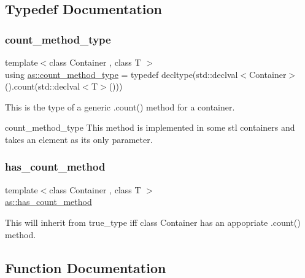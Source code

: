 \subsection{Typedef Documentation}
\mbox{\label{namespaceas_a9bd788709567003423247a9db4ba1074}} 
\subsubsection{\texorpdfstring{count\+\_\+method\+\_\+type}{count\_method\_type}}
{\footnotesize\ttfamily template$<$class Container , class T $>$ \\
using \hyperlink{namespaceas_a9bd788709567003423247a9db4ba1074}{as\+::count\+\_\+method\+\_\+type} = typedef decltype(std\+::declval$<$Container$>$().count(std\+::declval$<$T$>$()))}



This is the type of a generic .count() method for a container. 

count\+\_\+method\+\_\+type This method is implemented in some stl containers and takes an element as its only parameter. \mbox{\label{namespaceas_a9e0fcaa3ddb46647d8979282465685da}} 
\subsubsection{\texorpdfstring{has\+\_\+count\+\_\+method}{has\_count\_method}}
{\footnotesize\ttfamily template$<$class Container , class T $>$ \\
\hyperlink{namespaceas_a9e0fcaa3ddb46647d8979282465685da}{as\+::has\+\_\+count\+\_\+method}}



This will inherit from true\+\_\+type iff class Container has an appopriate .count() method. 



\subsection{Function Documentation}
\mbox{\label{namespaceas_a49cf7ae4239ab51e54f099d30a84811a}} 
